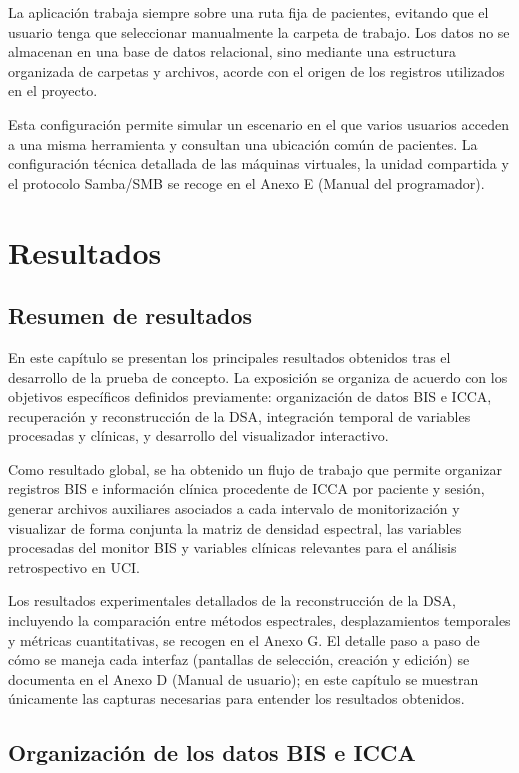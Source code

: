 \documentclass[
  spanish,
  a4paper,
  12pt,
  twoside]{memoir}
\newcommand{\capitulo}[2]{%
  \setcounter{chapter}{#1}%
  \setcounter{section}{0}%
  \setcounter{figure}{0}%
  \setcounter{table}{0}%
  \chapter*{#2}%
  \addcontentsline{toc}{chapter}{#2}%
  \markboth{#2}{#2}%
}
\begin{document}
La aplicación trabaja siempre sobre una ruta fija de pacientes, evitando
que el usuario tenga que seleccionar manualmente la carpeta de trabajo.
Los datos no se almacenan en una base de datos relacional, sino mediante
una estructura organizada de carpetas y archivos, acorde con el origen
de los registros utilizados en el proyecto.

Esta configuración permite simular un escenario en el que varios
usuarios acceden a una misma herramienta y consultan una ubicación común
de pacientes. La configuración técnica detallada de las máquinas
virtuales, la unidad compartida y el protocolo Samba/SMB se recoge en el
Anexo E (Manual del programador).

\capitulo{5}{Resultados}

\section{Resumen de resultados}\label{resumen-de-resultados}

En este capítulo se presentan los principales resultados obtenidos tras
el desarrollo de la prueba de concepto. La exposición se organiza de
acuerdo con los objetivos específicos definidos previamente:
organización de datos BIS e ICCA, recuperación y reconstrucción de la
DSA, integración temporal de variables procesadas y clínicas, y
desarrollo del visualizador interactivo.

Como resultado global, se ha obtenido un flujo de trabajo que permite
organizar registros BIS e información clínica procedente de ICCA por
paciente y sesión, generar archivos auxiliares asociados a cada
intervalo de monitorización y visualizar de forma conjunta la matriz de
densidad espectral, las variables procesadas del monitor BIS y variables
clínicas relevantes para el análisis retrospectivo en UCI.

Los resultados experimentales detallados de la reconstrucción de la DSA,
incluyendo la comparación entre métodos espectrales, desplazamientos
temporales y métricas cuantitativas, se recogen en el Anexo G. El
detalle paso a paso de cómo se maneja cada interfaz (pantallas de
selección, creación y edición) se documenta en el Anexo D (Manual de
usuario); en este capítulo se muestran únicamente las capturas
necesarias para entender los resultados obtenidos.

\section{Organización de los datos BIS e
ICCA}\label{organizaciuxf3n-de-los-datos-bis-e-icca}
\end{document}
